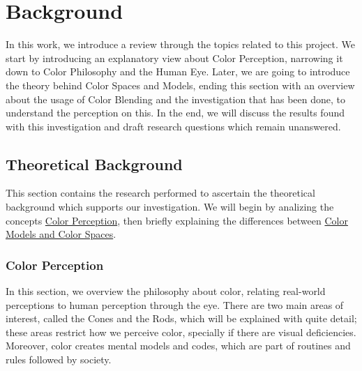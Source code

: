 
\chapter{Background}
\label{chapter:background}
%
In this work, we introduce a review through the topics related to this project. We start by introducing
an explanatory view about Color Perception, narrowing it down to Color Philosophy and the Human Eye. Later,
we are going to introduce the theory behind Color Spaces and Models, ending this section with an overview about
the usage of Color Blending and the investigation that has been done, to understand the perception on this. In
the end, we will discuss the results found with this investigation and draft research questions which remain
unanswered.
%
\section{Theoretical Background}
\label{sec:theory_background}
%
This section contains the research performed to ascertain the theoretical background which supports our investigation.
We will begin by analizing the concepts \ul{Color Perception}, then briefly explaining the differences between \ul{Color
Models and Color Spaces}.
%
\subsection{Color Perception}
\label{subsec:colorperception}
%
In this section, we overview the philosophy about color, relating real-world perceptions to human perception
through the eye. There are two main areas of interest, called the Cones and the Rods, which will be explained
with quite detail; these areas restrict how we perceive color, specially if there are visual deficiencies.
Moreover, color creates mental models and codes, which are part of routines and rules followed by society.
%
